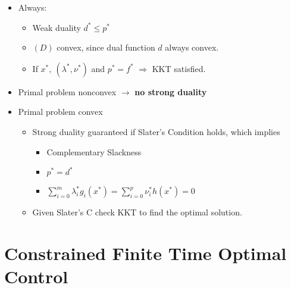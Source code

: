 \documentclass[8pt,a4paper]{scrartcl}
\begin{document}
\begin{multicols*}{3}
\begin{multicols*}{4}
{\begin{itemize}
\item Always:
\begin{itemize}
\item Weak duality $d^\ast\leq p^\ast$
\item $(D)$ convex, since dual function $d$ always convex.
\item If $x^\ast,\ (\lambda^\ast,\nu^\ast)$ and $p^\ast=f^\ast$ $\Rightarrow$ KKT satisfied.
\end{itemize}
\item Primal problem nonconvex $\rightarrow$ \textbf{no strong duality}
\item Primal problem convex
\begin{itemize}
\item Strong duality guaranteed if Slater's Condition holds, which implies
\begin{itemize}
\item Complementary Slackness
\item $p^\ast=d^\ast$
\item $\sum\limits_{i=0}^m\lambda_i^\ast g_i(x^\ast)=\sum\limits_{i=0}^p\nu_i^\ast h(x^\ast)=0$
\end{itemize}
\item Given Slater's C check KKT to find the optimal solution.
\end{itemize}
\end{itemize}
}%

\section{Constrained Finite Time Optimal Control}

\end{multicols*}
\end{multicols*}
\end{document}
